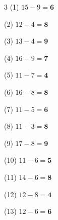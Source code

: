 \documentclass[a4paper, 11pt]{ltjsarticle}
\begin{document}
\hfill

\vspace*{2ex}

\vspace*{5ex}

\begin{multicols*}{3}
\noindent (1) \quad $15 - 9 = \mathbf{6}$
\vspace*{\fill}

\noindent (2) \quad $12 - 4 = \mathbf{8}$
\vspace*{\fill}

\noindent (3) \quad $13 - 4 = \mathbf{9}$
\vspace*{\fill}

\noindent (4) \quad $16 - 9 = \mathbf{7}$
\vspace*{\fill}

\noindent (5) \quad $11 - 7 = \mathbf{4}$
\vspace*{\fill}

\noindent (6) \quad $16 - 8 = \mathbf{8}$
\vspace*{\fill}

\noindent (7) \quad $11 - 5 = \mathbf{6}$
\vspace*{\fill}

\noindent (8) \quad $11 - 3 = \mathbf{8}$
\vspace*{\fill}

\noindent (9) \quad $17 - 8 = \mathbf{9}$
\vspace*{\fill}

\noindent (10) \quad $11 - 6 = \mathbf{5}$
\vspace*{\fill}

\noindent (11) \quad $14 - 6 = \mathbf{8}$
\vspace*{\fill}

\noindent (12) \quad $12 - 8 = \mathbf{4}$
\vspace*{\fill}
\columnbreak

\noindent (13) \quad $12 - 6 = \mathbf{6}$
\vspace*{\fill}


\end{multicols*}
\end{document}
